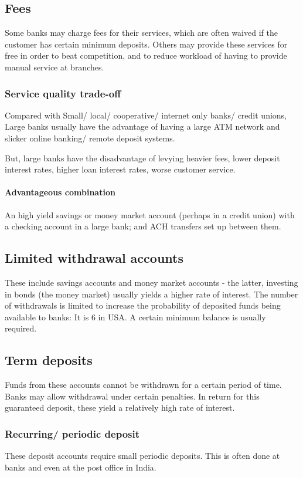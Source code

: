 \documentclass[oneside, article]{memoir}
\begin{document}
\subsection{Fees}
Some banks may charge fees for their services, which are often waived if the customer has certain minimum deposits. Others may provide these services for free in order to beat competition, and to reduce workload of having to provide manual service at branches.

\subsubsection{Service quality trade-off}
Compared with Small/ local/ cooperative/ internet only banks/ credit unions, Large banks usually have the advantage of having a large ATM network and slicker online banking/ remote deposit systems.

But, large banks have the disadvantage of levying heavier fees, lower deposit interest rates, higher loan interest rates, worse customer service.

\paragraph{Advantageous combination}
An high yield savings or money market account (perhaps in a credit union) with a checking account in a large bank; and ACH transfers set up between them.

\subsection{Limited withdrawal accounts}
These include savings accounts and money market accounts - the latter, investing in bonds (the money market) usually yields a higher rate of interest. The number of withdrawals is limited to increase the probability of deposited funds being available to banks: It is 6 in USA. A certain minimum balance is usually required.

\subsection{Term deposits}
Funds from these accounts cannot be withdrawn for a certain period of time. Banks may allow withdrawal under certain penalties. In return for this guaranteed  deposit, these yield a relatively high rate of interest.

\subsubsection{Recurring/ periodic deposit}
These deposit accounts require small periodic deposits. This is often done at banks and even at the post office in India.
\end{document}
